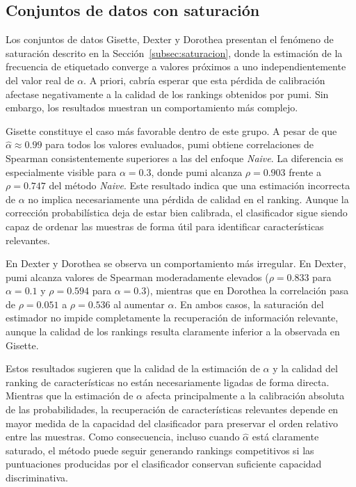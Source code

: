 \subsection{Conjuntos de datos con saturación}
\label{subsec:rankings_saturados}

Los conjuntos de datos Gisette, Dexter y Dorothea presentan el fenómeno de saturación descrito en la Sección~\ref{subsec:saturacion}, donde la estimación de la frecuencia de etiquetado converge a valores próximos a uno independientemente del valor real de $\alpha$. A priori, cabría esperar que esta pérdida de calibración afectase negativamente a la calidad de los rankings obtenidos por \acrshort{pumi}. Sin embargo, los resultados muestran un comportamiento más complejo.

Gisette constituye el caso más favorable dentro de este grupo. A pesar de que $\hat{\alpha}\approx0.99$ para todos los valores evaluados, \acrshort{pumi} obtiene correlaciones de Spearman consistentemente superiores a las del enfoque \textit{Naive}. La diferencia es especialmente visible para $\alpha=0.3$, donde \acrshort{pumi} alcanza $\rho=0.903$ frente a $\rho=0.747$ del método \textit{Naive}. Este resultado indica que una estimación incorrecta de $\alpha$ no implica necesariamente una pérdida de calidad en el ranking. Aunque la corrección probabilística deja de estar bien calibrada, el clasificador sigue siendo capaz de ordenar las muestras de forma útil para identificar características relevantes.

En Dexter y Dorothea se observa un comportamiento más irregular. En Dexter, \acrshort{pumi} alcanza valores de Spearman moderadamente elevados ($\rho=0.833$ para $\alpha=0.1$ y $\rho=0.594$ para $\alpha=0.3$), mientras que en Dorothea la correlación pasa de $\rho=0.051$ a $\rho=0.536$ al aumentar $\alpha$. En ambos casos, la saturación del estimador no impide completamente la recuperación de información relevante, aunque la calidad de los rankings resulta claramente inferior a la observada en Gisette.

Estos resultados sugieren que la calidad de la estimación de $\alpha$ y la calidad del ranking de características no están necesariamente ligadas de forma directa. Mientras que la estimación de $\alpha$ afecta principalmente a la calibración absoluta de las probabilidades, la recuperación de características relevantes depende en mayor medida de la capacidad del clasificador para preservar el orden relativo entre las muestras. Como consecuencia, incluso cuando $\hat{\alpha}$ está claramente saturado, el método puede seguir generando rankings competitivos si las puntuaciones producidas por el clasificador conservan suficiente capacidad discriminativa.

